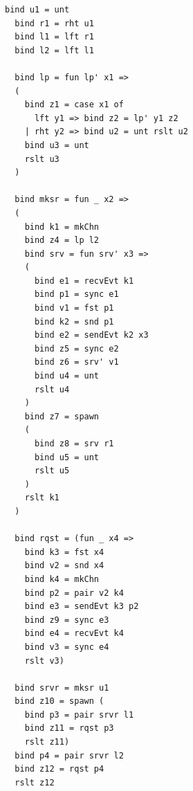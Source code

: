 \documentclass[10pt]{article}
\begin{document}
\begin{lstlisting}[language=normal_lang, mathescape]
  bind u1 = unt
  bind r1 = rht u1
  bind l1 = lft r1
  bind l2 = lft l1

  bind lp = fun lp' x1 => 
  (
    bind z1 = case x1 of 
      lft y1 => bind z2 = lp' y1 z2
    | rht y2 => bind u2 = unt rslt u2
    bind u3 = unt
    rslt u3
  )

  bind mksr = fun _ x2 => 
  (
    bind k1 = mkChn
    bind z4 = lp l2
    bind srv = fun srv' x3 =>
    (
      bind e1 = recvEvt k1
      bind p1 = sync e1
      bind v1 = fst p1
      bind k2 = snd p1 
      bind e2 = sendEvt k2 x3
      bind z5 = sync e2
      bind z6 = srv' v1
      bind u4 = unt
      rslt u4
    )
    bind z7 = spawn
    (
      bind z8 = srv r1
      bind u5 = unt
      rslt u5
    )
    rslt k1
  )

  bind rqst = (fun _ x4 =>
    bind k3 = fst x4
    bind v2 = snd x4
    bind k4 = mkChn
    bind p2 = pair v2 k4
    bind e3 = sendEvt k3 p2
    bind z9 = sync e3
    bind e4 = recvEvt k4
    bind v3 = sync e4
    rslt v3)

  bind srvr = mksr u1
  bind z10 = spawn ( 
    bind p3 = pair srvr l1
    bind z11 = rqst p3
    rslt z11)
  bind p4 = pair srvr l2
  bind z12 = rqst p4
  rslt z12
  \end{lstlisting}
\end{document}
